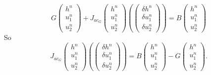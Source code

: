 \documentclass[a4paper, 11pt]{article}
\begin{document}
\begin{equation*}
G\begin{pmatrix}h^{n}\\u_1^{n}\\u_2^{n}\end{pmatrix}+J_{ac_G}\begin{pmatrix}h^n\\u_1^n\\u_2^n\end{pmatrix}\left(\begin{pmatrix}\delta h^n\\\delta u_1^n\\\delta u_2^n\end{pmatrix}\right)=B\begin{pmatrix}h^n\\u_1^n\\u_2^n\end{pmatrix}
\end{equation*}
So
\begin{equation*}
J_{ac_G}\begin{pmatrix}h^n\\u_1^n\\u_2^n\end{pmatrix}\left(\begin{pmatrix}\delta h^n\\\delta u_1^n\\\delta u_2^n\end{pmatrix}\right)=B\begin{pmatrix}h^n\\u_1^n\\u_2^n\end{pmatrix}-G\begin{pmatrix}h^{n}\\u_1^{n}\\u_2^{n}\end{pmatrix}.
\end{equation*}
\end{document}
